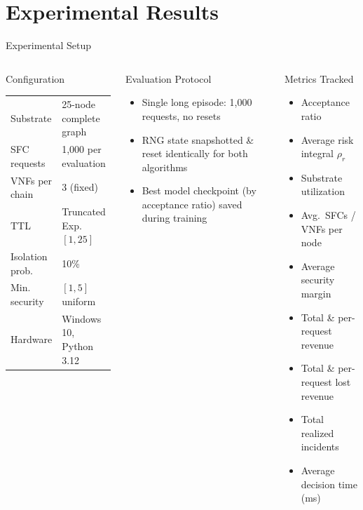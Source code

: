 \section{Experimental Results}

\begin{frame}{Experimental Setup}
  \begin{columns}[T]
      \begin{block}{Configuration}
        \footnotesize
        \begin{tabular}{ll}
          \toprule
          Substrate       & 25-node complete graph\\
          SFC requests    & 1,000 per evaluation\\
          VNFs per chain  & 3 (fixed)\\
          TTL             & Truncated Exp.$[1,25]$\\
          Isolation prob. & 10\%\\
          Min. security   & $[1,5]$ uniform\\
          \midrule
          Hardware        & Windows 10, Python 3.12\\
          \bottomrule
        \end{tabular}
      \end{block}
      \vspace{4pt}
      \begin{block}{Evaluation Protocol}
        \footnotesize
        \begin{itemize}
          \item Single long episode: 1,000 requests, no resets
          \item RNG state snapshotted \& reset identically for both algorithms
          \item Best model checkpoint (by acceptance ratio) saved during training
        \end{itemize}
      \end{block}
      \begin{block}{Metrics Tracked}
        \footnotesize
        \begin{itemize}
          \item Acceptance ratio
          \item Average risk integral $\rho_r$
          \item Substrate utilization
          \item Avg.\ SFCs / VNFs per node
          \item Average security margin
          \item Total \& per-request revenue
          \item Total \& per-request lost revenue
          \item Total realized incidents
          \item Average decision time (ms)
        \end{itemize}
      \end{block}
  \end{columns}
\end{frame}

